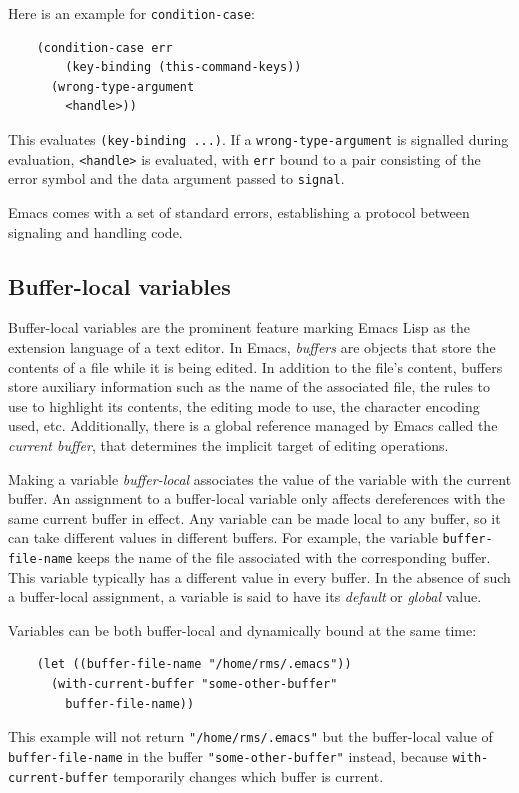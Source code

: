 \documentclass[format=acmsmall, review]{acmart}
\newcommand \Elisp {Emacs Lisp}
\begin{document}
Here is an example for \texttt{condition-case}:
\begin{verbatim}
    (condition-case err
        (key-binding (this-command-keys))
      (wrong-type-argument
        <handle>))
\end{verbatim}
This evaluates \texttt{(key-binding ...)}.  If a
\texttt{wrong-type-argument} is signalled during evaluation,
\texttt{<handle>} is evaluated, with \texttt{err} bound to a pair
consisting of the error symbol and the data argument passed to
\texttt{signal}.

Emacs comes with a set of standard errors, establishing a protocol
between signaling and handling code.

\subsection{Buffer-local variables}
\label{sec:buffer-local-variables}

Buffer-local variables are the prominent feature marking \Elisp{} as the
extension language of a text editor.  In Emacs, \emph{buffers} are objects
that store the contents of a file while it is being edited.  In addition to
the file's content, buffers store auxiliary information such
as the name of the associated file, the rules to use to highlight its
contents, the editing mode to use, the character encoding used, etc.
Additionally, there is a global reference managed by Emacs called the
\emph{current buffer}, that determines the implicit target of
editing operations.

Making a variable \emph{buffer-local} associates the value of the variable
with the current buffer.  An assignment to a buffer-local variable
only affects dereferences with the same current buffer in effect.
Any variable can be made local to any buffer, so it can take
different values in different buffers.  For example, the variable
\texttt{buffer-file-name} keeps the name of the file associated with the
corresponding buffer.  This variable typically has a different value in
every buffer.  In the absence of such a buffer-local assignment, a variable
is said to have its \emph{default} or \emph{global} value.

Variables can be both buffer-local and dynamically bound at the same time:
\begin{verbatim}
    (let ((buffer-file-name "/home/rms/.emacs"))
      (with-current-buffer "some-other-buffer"
        buffer-file-name))
\end{verbatim}
This example will not return \texttt{"/home/rms/.emacs"} but the
buffer-local value of \texttt{buffer-file-name} in the buffer
\texttt{"some-other-buffer"} instead, because \texttt{with-current-buffer}
temporarily changes which buffer is current.
\end{document}
